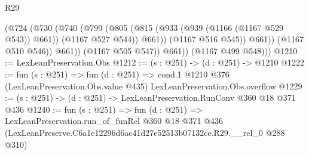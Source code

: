 \begin{lexlean}{R29}
\begin{coremodule}
                    (@724
                      (@730
                        (@740
                          (@799
                            (@805
                              (@815 (@933 (@939 (@1166 (@1167 @529 @543)) @661)) (@1167 @527 @544))
                              @661))
                          (@1167 @516 @545))
                        @661))
                    (@1167 @510 @546))
                  @661))
              (@1167 @505 @547))
            @661))
        (@1167 @499 @548)))
@1210 := LexLeanPreservation.Obs
@1212 := (s : @251) -> (d : @251) -> @1210
@1222 := fun (s : @251) =>
  fun (d : @251) =>
  cond.{1} @1210 @376 (LexLeanPreservation.Obs.value @435) LexLeanPreservation.Obs.overflow
@1229 := (s : @251) -> (d : @251) -> LexLeanPreservation.RunConv @360 @18 @371 @436
@1240 := fun (s : @251) =>
  fun (d : @251) =>
  LexLeanPreservation.run_of_funRel
    @360
    @18
    @371
    @436
    (LexLeanPreserve.C6a1e12296d6ac41d27e52513b07132ce.R29.__rel_0 @288 @310)
\end{coremodule}
\end{lexlean}
